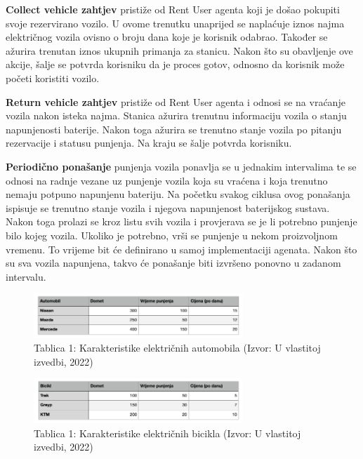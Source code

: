 \documentclass{foi}
\begin{document}
\textbf{Collect vehicle zahtjev} pristiže od Rent User agenta koji je došao pokupiti svoje rezervirano vozilo. U ovome trenutku unaprijed se naplaćuje iznos najma električnog vozila ovisno o broju dana koje je korisnik odabrao. Također se ažurira trenutan iznos ukupnih primanja za stanicu. Nakon što su obavljenje ove akcije, šalje se potvrda korisniku da je proces gotov, odnosno da korisnik može početi koristiti vozilo.

\textbf{Return vehicle zahtjev} pristiže od Rent User agenta i odnosi se na vraćanje vozila nakon isteka najma. Stanica ažurira trenutnu informaciju vozila o stanju napunjenosti baterije. Nakon toga ažurira se trenutno stanje vozila po pitanju rezervacije i statusu punjenja. Na kraju se šalje potvrda korisniku.

\textbf{Periodično ponašanje} punjenja vozila ponavlja se u jednakim intervalima te se odnosi na radnje vezane uz punjenje vozila koja su vraćena i koja trenutno nemaju potpuno napunjenu bateriju. Na početku svakog ciklusa ovog ponašanja ispisuje se trenutno stanje vozila i njegova napunjenost baterijskog sustava. Nakon toga prolazi se kroz listu svih vozila i provjerava se je li potrebno punjenje bilo kojeg vozila. Ukoliko je potrebno, vrši se punjenje u nekom proizvoljnom vremenu. To vrijeme bit će definirano u samoj implementaciji agenata. Nakon što su sva vozila napunjena, takvo će ponašanje biti izvršeno ponovno u zadanom intervalu.

\begin{figure}[h!]
	\centering
	\includegraphics[width=0.7\textwidth]{slike/tablica1.png}
	\caption{Tablica 1: Karakteristike električnih automobila (Izvor: U vlastitoj izvedbi, 2022)}
\end{figure}

\begin{figure}[h!]
	\centering
	\includegraphics[width=0.7\textwidth]{slike/tablica2.png}
	\caption{Tablica 1: Karakteristike električnih bicikla (Izvor: U vlastitoj izvedbi, 2022)}
\end{figure}
\end{document}
